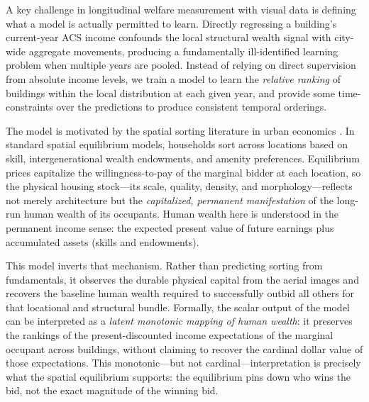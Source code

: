\documentclass[conference]{IEEEtran}
\begin{document}
A key challenge in longitudinal welfare measurement with visual data is defining what a model is actually permitted to learn. Directly regressing a building's current-year ACS income confounds the local structural wealth signal with city-wide aggregate movements, producing a fundamentally ill-identified learning problem when multiple years are pooled. Instead of relying on direct supervision from absolute income levels, we train a model to learn the \emph{relative ranking} of buildings within the local distribution at each given year, and provide some time-constraints over the predictions to produce consistent temporal orderings.

The model is motivated by the spatial sorting literature in urban economics \citep{ahlfeldt2015economics, diamond2016determinants}. In standard spatial equilibrium models, households sort across locations based on skill, intergenerational wealth endowments, and amenity preferences. Equilibrium prices capitalize the willingness-to-pay of the marginal bidder at each location, so the physical housing stock---its scale, quality, density, and morphology---reflects not merely architecture but the \textit{capitalized, permanent manifestation} of the long-run human wealth of its occupants. Human wealth here is understood in the permanent income sense: the expected present value of future earnings plus accumulated assets (skills and endowments).

This model inverts that mechanism. Rather than predicting sorting from fundamentals, it observes the durable physical capital from the aerial images and recovers the baseline human wealth required to successfully outbid all others for that locational and structural bundle. Formally, the scalar output of the model can be interpreted as a \textit{latent monotonic mapping of human wealth}: it preserves the rankings of the present-discounted income expectations of the marginal occupant across buildings, without claiming to recover the cardinal dollar value of those expectations. This monotonic---but not cardinal---interpretation is precisely what the spatial equilibrium supports: the equilibrium pins down who wins the bid, not the exact magnitude of the winning bid.
\end{document}

